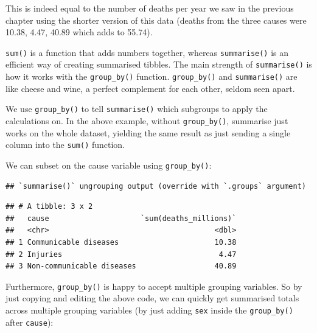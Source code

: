 \documentclass[
  12pt,
  krantz2]{krantz}
\makeatletter
\newenvironment{Shaded}{\begin{snugshade}}{\end{snugshade}}
\newcommand{\KeywordTok}[1]{\textcolor[rgb]{0.13,0.29,0.53}{\textbf{#1}}}
\newcommand{\NormalTok}[1]{#1}
\newcommand{\OperatorTok}[1]{\textcolor[rgb]{0.81,0.36,0.00}{\textbf{#1}}}
\newcommand{\StringTok}[1]{\textcolor[rgb]{0.31,0.60,0.02}{#1}}
\newenvironment{kframe}{%
\medskip{}
\setlength{\fboxsep}{.8em}
 \def\at@end@of@kframe{}%
 \ifinner\ifhmode%
  \def\at@end@of@kframe{\end{minipage}}%
  \begin{minipage}{\columnwidth}%
 \fi\fi%
 \def\FrameCommand##1{\hskip\@totalleftmargin \hskip-\fboxsep
 \colorbox{shadecolor}{##1}\hskip-\fboxsep
     \hskip-\linewidth \hskip-\@totalleftmargin \hskip\columnwidth}%
 \MakeFramed {\advance\hsize-\width
   \@totalleftmargin\z@ \linewidth\hsize
   \@setminipage}}%
 {\par\unskip\endMakeFramed%
 \at@end@of@kframe}
\renewenvironment{Shaded}{\begin{kframe}}{\end{kframe}}
\makeatother
\begin{document}
This is indeed equal to the number of deaths per year we saw in the previous chapter using the shorter version of this data (deaths from the three causes were 10.38, 4.47, 40.89 which adds to 55.74).

\texttt{sum()} is a function that adds numbers together, whereas \texttt{summarise()} is an efficient way of creating summarised tibbles.
The main strength of \texttt{summarise()} is how it works with the \texttt{group\_by()} function.
\texttt{group\_by()} and \texttt{summarise()} are like cheese and wine, a perfect complement for each other, seldom seen apart.

We use \texttt{group\_by()} to tell \texttt{summarise()} which subgroups to apply the calculations on.
In the above example, without \texttt{group\_by()}, summarise just works on the whole dataset, yielding the same result as just sending a single column into the \texttt{sum()} function.

We can subset on the cause variable using \texttt{group\_by()}:

\begin{Shaded}
\end{Shaded}

\begin{verbatim}
## `summarise()` ungrouping output (override with `.groups` argument)
\end{verbatim}

\begin{verbatim}
## # A tibble: 3 x 2
##   cause                     `sum(deaths_millions)`
##   <chr>                                      <dbl>
## 1 Communicable diseases                      10.38
## 2 Injuries                                    4.47
## 3 Non-communicable diseases                  40.89
\end{verbatim}

Furthermore, \texttt{group\_by()} is happy to accept multiple grouping variables.
So by just copying and editing the above code, we can quickly get summarised totals across multiple grouping variables (by just adding \texttt{sex} inside the \texttt{group\_by()} after \texttt{cause}):

\begin{Shaded}
\end{Shaded}
\end{document}
